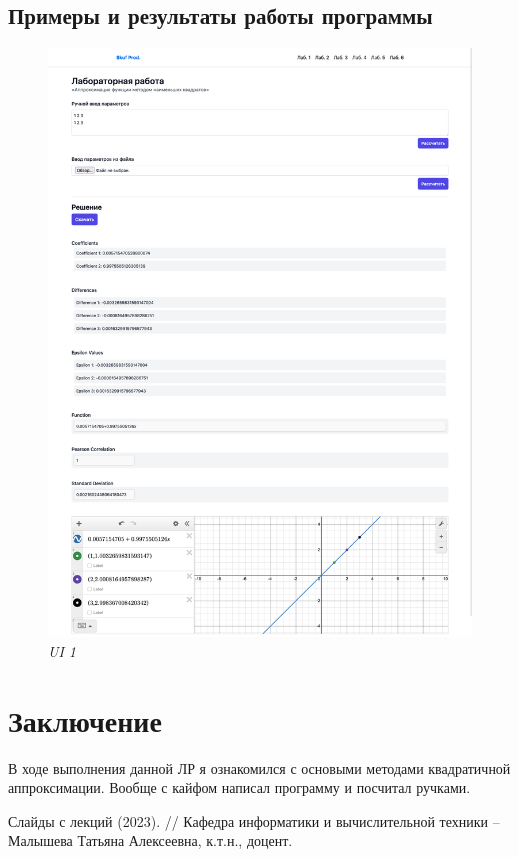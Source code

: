 \documentclass{article}
\begin{document}
      \subsection{Примеры и результаты работы программы}
            \begin{figure}[H] 
                  \begin{center}  
                         \includegraphics[scale=0.1]{ui.png}
                        \caption{\small \sl {UI  1}}  
                  \end{center}  
            \end{figure}
            
\section{Заключение}
      В ходе выполнения данной ЛР я ознакомился с основыми методами квадратичной аппроксимации. Вообще с кайфом написал программу и посчитал ручками.

\begin{thebibliography}{9}
    Слайды с лекций (2023). // Кафедра информатики и вычислительной техники -- Малышева Татьяна Алексеевна, к.т.н., доцент.
\end{thebibliography} 
\end{document}
